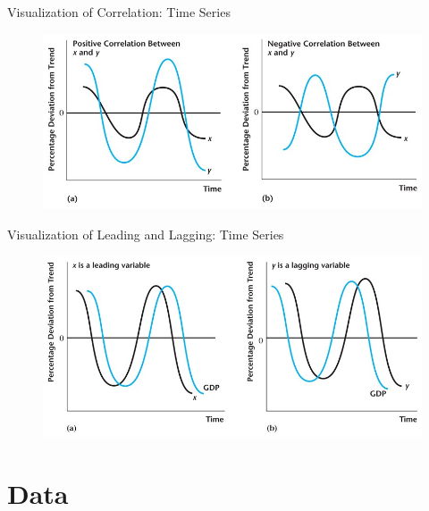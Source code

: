 \documentclass[11pt,aspectratio=169,usenames,dvipsnames]{beamer}
\begin{document}
\begin{frame}{Visualization of Correlation: Time Series}
\label{slide:Visualization_of_Correlation__Time_Series}
    \begin{figure}
        \includegraphics[width=\textwidth]{./figures/Figure3_3.jpg}
    \end{figure}
\end{frame}

\begin{frame}{Visualization of Leading and Lagging: Time Series}
\label{slide:Visualization_of_Leading_and_Lagging__Time_Series}
    \begin{figure}
        \includegraphics[width=\textwidth]{./figures/Figure3_7.jpg}
    \end{figure}
\end{frame}


\section{Data}
\label{sec:Data}
\end{document}
